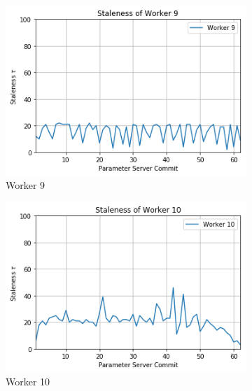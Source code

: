 \begin{figure}
\begin{subfigure}{.24\textwidth}
    \includegraphics[width=\linewidth]{resources/images/plots/adag_agn_mnist/epoch_40/15/001/staleness/worker_9}
    \caption{Worker 9}
  \end{subfigure}
  \begin{subfigure}{.24\textwidth}
    \centering
    \includegraphics[width=\linewidth]{resources/images/plots/adag_agn_mnist/epoch_40/15/001/staleness/worker_10}
    \caption{Worker 10}
  \end{subfigure}
  \begin{subfigure}{.24\textwidth}
    \centering

\end{subfigure}
\end{figure}

